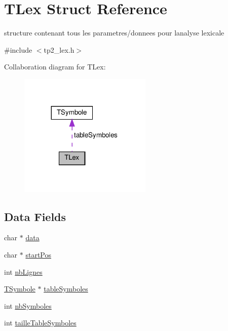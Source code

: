 \hypertarget{structTLex}{}\section{T\+Lex Struct Reference}
\label{structTLex}


structure contenant tous les parametres/donnees pour l\textquotesingle{}analyse lexicale  




{\ttfamily \#include $<$tp2\+\_\+lex.\+h$>$}



Collaboration diagram for T\+Lex\+:\nopagebreak
\begin{figure}[H]
\begin{center}
\leavevmode
\includegraphics[width=179pt]{structTLex__coll__graph}
\end{center}
\end{figure}
\subsection*{Data Fields}
\begin{DoxyCompactItemize}
\item 
char $\ast$ \hyperlink{structTLex_a2242e630c3f871659c3e36b101b504b4}{data}
\item 
char $\ast$ \hyperlink{structTLex_a1122e1ced17c2c07f7975b4f11110ad8}{start\+Pos}
\item 
int \hyperlink{structTLex_a74499b75b25dc1bce1fb2f66af6ce1e2}{nb\+Lignes}
\item 
\hyperlink{structTSymbole}{T\+Symbole} $\ast$ \hyperlink{structTLex_a31a6c4fc0839643e3251a372ba7adf04}{table\+Symboles}
\item 
int \hyperlink{structTLex_a84d0d3a30f4b42f8db675f8cbb60373f}{nb\+Symboles}
\item 
int \hyperlink{structTLex_abb50eca8f47fc2c73983a5909967e362}{taille\+Table\+Symboles}
\end{DoxyCompactItemize}


